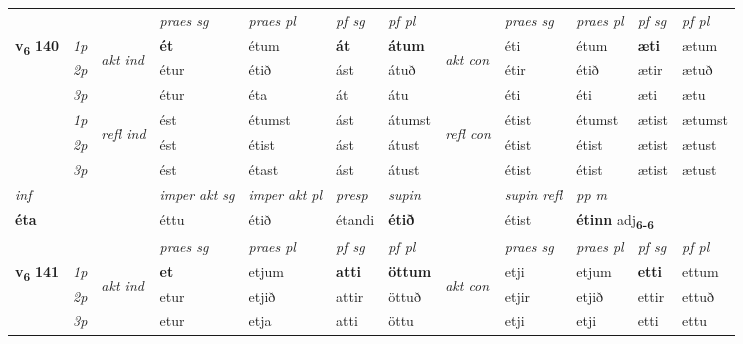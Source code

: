 \begin{longtable}[l]{X>{\footnotesize\itshape}llXXXXlXXXX}
 & &   & \textit{praes sg}  & \textit{praes pl}    & \textit{ pf sg} & \textit{pf pl} & & \textit{praes sg}  & \textit{praes pl}    & \textit{pf sg} & \textit{pf pl }  \\ \cmidrule{4-7} \cmidrule{9-12}
 \multirow{2}{*}{{{\textbf{v{\textsubscript{6}}} \Large{\textbf{140}}}}}  & 1p & \multirow{3}{*}{\begin{turn}{90}\textit{akt ind}\end{turn}} & \textbf{ét} & étum & \textbf{át} & \textbf{átum} & \multirow{3}{*}{\begin{turn}{90}\textit{akt con}\end{turn}} &éti & étum & \textbf{æti} & ætum\\*
 & 2p &  &  étur  & étið & ást & átuð & & étir & étið & ætir & ætuð \\*
 & 3p &  & étur & éta & át & átu & & éti & éti& æti & ætu \\*
\cmidrule{4-7} \cmidrule{9-12}
 & 1p & \multirow{3}{*}{\begin{turn}{90}\textit{refl ind}\end{turn}}  & ést & étumst & ást & átumst & \multirow{3}{*}{\begin{turn}{90}\textit{refl con}\end{turn}}  &étist & étumst & ætist & ætumst \\*
 & 2p &  & ést & étist & ást & átust & &étist & étist & ætist & ætust \\*
 & 3p  & & ést & étast & ást & átust & & étist & étist& ætist & ætust \\*
\cmidrule{4-7} \cmidrule{9-12}

   {\textit{inf}} & &  & \textit{imper akt sg} & \textit{imper akt pl}   & \textit{presp} & \textit{supin} && \textit{supin refl} & \textit{pp m} \\*
  {\textbf{éta}} & && éttu  & étið   & étandi &  \textbf{étið} && étist & \multicolumn{2}{l}{\textbf{étinn} adj\textbf{\textsubscript{6-6}}} \\*

\midrule

 \midrule
 & &   & \textit{praes sg}  & \textit{praes pl}    & \textit{ pf sg} & \textit{pf pl} & & \textit{praes sg}  & \textit{praes pl}    & \textit{pf sg} & \textit{pf pl }  \\ \cmidrule{4-7} \cmidrule{9-12}
 \multirow{2}{*}{{{\textbf{v{\textsubscript{6}}} \Large{\textbf{141}}}}}  & 1p & \multirow{3}{*}{\begin{turn}{90}\textit{akt ind}\end{turn}} & \textbf{et} & etjum & \textbf{atti} & \textbf{öttum} & \multirow{3}{*}{\begin{turn}{90}\textit{akt con}\end{turn}} &etji & etjum & \textbf{etti} & ettum\\*
 & 2p &  &  etur  & etjið & attir & öttuð & & etjir & etjið & ettir & ettuð \\*
 & 3p &  & etur & etja & atti & öttu & & etji & etji& etti & ettu \\*
\cmidrule{4-7} \cmidrule{9-12}


\end{longtable}

